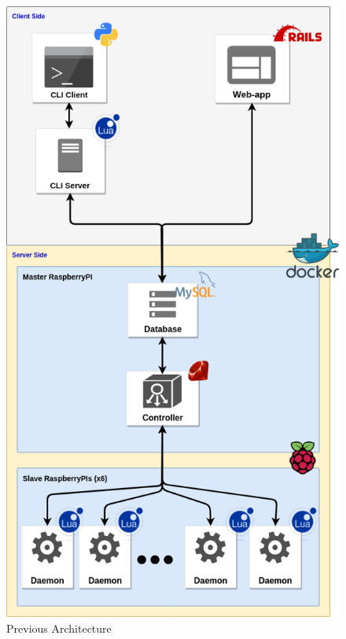 \documentclass{eplmastersthesis}
\begin{document}
      \begin{figure}[!tbp]
        \centering
        \begin{minipage}[b]{0.45\textwidth}
          \includegraphics[width=\textwidth]{figures/prev_arch.png}
          \caption{Previous Architecture}
        \end{minipage}
        \hfill
        \begin{minipage}[b]{0.45\textwidth}

\end{minipage}
\end{figure}
\end{document}
